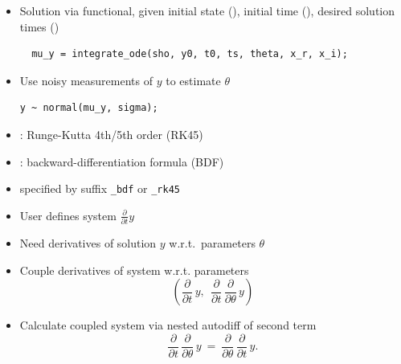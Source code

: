 \documentclass[10pt]{report}
\begin{document}
%
\begin{itemize}
\item Solution via functional, given initial state (),
initial time (), desired solution times ()
{\footnotesize
\begin{Verbatim}
  mu_y = integrate_ode(sho, y0, t0, ts, theta, x_r, x_i);
\end{Verbatim}
}
\item Use noisy measurements of $y$ to estimate $\theta$
\begin{Verbatim}
y ~ normal(mu_y, sigma);
\end{Verbatim}
\end{itemize}


%
\begin{itemize}
\item {}: Runge-Kutta 4th/5th order (RK45)
\item {}:  backward-differentiation formula (BDF)
\item specified by suffix \Verb|_bdf| or \Verb|_rk45|
\end{itemize}


%
\begin{itemize}
\item User defines system $\frac{\partial}{\partial t} y$
\item Need derivatives of solution $y$ w.r.t.\ parameters $\theta$
\item Couple derivatives of system  w.r.t. parameters
\[
\left(
\frac{\partial}{\partial t} \, y, \ \
\frac{\partial}{\partial t} \, \frac{\partial}{\partial \theta} \, y
\right)
\]
\item Calculate coupled system via nested autodiff of second term
\[
\frac{\partial}{\partial t} \, \frac{\partial}{\partial \theta} \, y
\ = \
\frac{\partial}{\partial \theta} \, \frac{\partial}{\partial t} \, y.
\]
\end{itemize}
\end{document}

